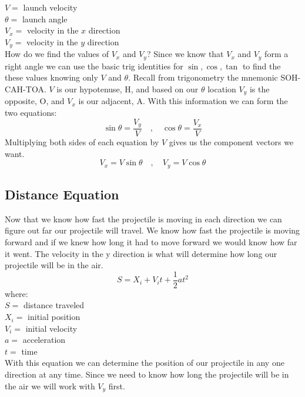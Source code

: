 \documentclass[10pt,a4paper]{article}
\begin{document}
		\noindent
		$V =$ launch velocity \\
		$\theta =$ launch angle \\
		$V_x =$ velocity in the $x$ direction \\
		$V_y =$ velocity in the $y$ direction \\
		
		How do we find the values of $V_x$ and $V_y$?
		Since we know that $V_x$ and $V_y$ form a right angle we can use the basic trig identities for $\sin, \cos, \tan$ to find the these values knowing only $V$ and $\theta$.
		Recall from trigonometry the mnemonic SOH-CAH-TOA.
		$V$ is our hypotenuse, H, and based on our $\theta$ location $V_y$ is the opposite, O, and $V_x$ is our adjacent, A.
		\clearpage
		With this information we can form the two equations:
		\[\sin\theta = \frac{V_y}{V} \quad, \quad \cos\theta = \frac{V_x}{V}\]
		Multiplying both sides of each equation by $V$ gives us the component vectors we want.
		\begin{equation}
			V_x = V \sin\theta \quad, \quad V_y = V \cos\theta
			\label{eq:componentVectors}
		\end{equation}
		
	\subsection{Distance Equation}
		Now that we know how fast the projectile is moving in each direction we can figure out far our projectile will travel.
		We know how fast the projectile is moving forward and if we knew how long it had to move forward we would know how far it went.
		The velocity in the y direction is what will determine how long our projectile will be in the air.		
		\begin{equation}
			S = X_i + V_i t + \frac{1}{2}at^2
			\label{eq:posEquation}
		\end{equation}
		where: \\
		$S =$ distance traveled \\
		$X_i =$ initial position \\
		$V_i = $ initial velocity \\
		$a =$ acceleration \\
		$t =$ time \\
		With this equation we can determine the position of our projectile in any one direction at any time.
		Since we need to know how long the projectile will be in the air we will work with $V_y$ first.
\end{document}
